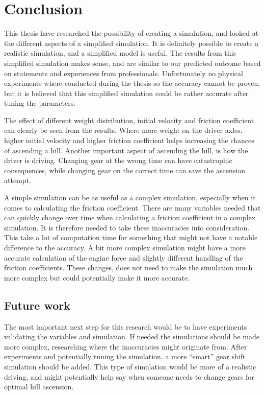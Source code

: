 \documentclass[noprint]{uit-thesis}
\begin{document}
\chapter{Conclusion}
This thesis have researched the possibility of creating a simulation, and looked at the different aspects of a simplified simulation. It is definitely possible to create a realistic simulation, and a simplified model is useful. The results from this simplified simulation makes sense, and are similar to our predicted outcome based on statements and experiences from professionals. Unfortunately no physical experiments where conducted during the thesis so the accuracy cannot be proven, but it is believed that this simplified simulation could be rather accurate after tuning the parameters. 
\par
The effect of different weight distribution, initial velocity and friction coefficient can clearly be seen from the results. Where more weight on the driver axles, higher initial velocity and higher friction coefficient helps increasing the chances of ascending a hill. Another important aspect of ascending the hill, is how the driver is driving. Changing gear at the wrong time can have catastrophic consequences, while changing gear on the correct time can save the ascension attempt. 
\par
A simple simulation can be as useful as a complex simulation, especially when it comes to calculating the friction coefficient. There are many variables needed that can quickly change over time when calculating a friction coefficient in a complex simulation. It is therefore needed to take these inaccuracies into consideration. This take a lot of computation time for something that might not have a notable difference to the accuracy. A bit more complex simulation might have a more accurate calculation of the engine force and slightly different handling of the friction coefficients. These changes, does not need to make the simulation much more complex but could potentially make it more accurate.

\section{Future work}
The most important next step for this research would be to have experiments validating the variables and simulation. If needed the simulations should be made more complex, researching where the inaccuracies might originate from. After experiments and potentially tuning the simulation, a more “smart” gear shift simulation should be added. This type of simulation would be more of a realistic driving, and might potentially help say when someone needs to change gears for optimal hill ascension. 
\par






\backmatter
\end{document}
